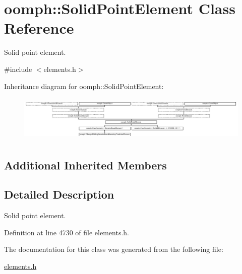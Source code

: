 \hypertarget{classoomph_1_1SolidPointElement}{}\section{oomph\+:\+:Solid\+Point\+Element Class Reference}
\label{classoomph_1_1SolidPointElement}


Solid point element.  




{\ttfamily \#include $<$elements.\+h$>$}

Inheritance diagram for oomph\+:\+:Solid\+Point\+Element\+:\begin{figure}[H]
\begin{center}
\leavevmode
\includegraphics[height=2.234043cm]{classoomph_1_1SolidPointElement}
\end{center}
\end{figure}
\subsection*{Additional Inherited Members}


\subsection{Detailed Description}
Solid point element. 

Definition at line 4730 of file elements.\+h.



The documentation for this class was generated from the following file\+:\begin{DoxyCompactItemize}
\item 
\hyperlink{elements_8h}{elements.\+h}\end{DoxyCompactItemize}
